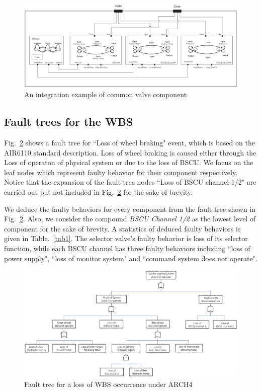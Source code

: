 \begin{figure}[htbp]
	\centerline{\includegraphics[width=125mm]{figure/Example.eps}}
	\caption{An integration example of common valve component}
	\label{Example}
\end{figure}

\subsection{Fault trees for the WBS}
Fig.~\ref{WBS_BIP_fault_tree} shows a fault tree for ``Loss of wheel braking" event, which is based on the AIR6110 standard description. Loss of wheel braking is caused either through the Loss of operaton of physical system or due to the loss of BSCU. We focus on the leaf nodes which represent faulty behavior for their component respectively. Notice that the expansion of the fault tree nodes ``Loss of BSCU channel 1/2" are carried out but not included in Fig.~\ref{WBS_BIP_fault_tree} for the sake of brevity.

We deduce the faulty behaviors for every component from the fault tree shown in Fig.~\ref{WBS_BIP_fault_tree}. Also, we consider the compound \emph{BSCU Channel 1/2} as the lowest level of component for the sake of brevity. A statistics of deduced faulty behaviors is given in Table.~\ref{tab1}. The selector valve's faulty behavior is loss of its selector function, while each BSCU channel has three faulty behaviors including ``loss of power supply", ``loss of monitor system" and ``command system does not operate".

\begin{figure}[htbp]
	\centerline{\includegraphics[width=125mm]{figure/fault_tree.eps}}
	\caption{Fault tree for a loss of WBS occurrence under ARCH4}
	\label{WBS_BIP_fault_tree}
\end{figure}

